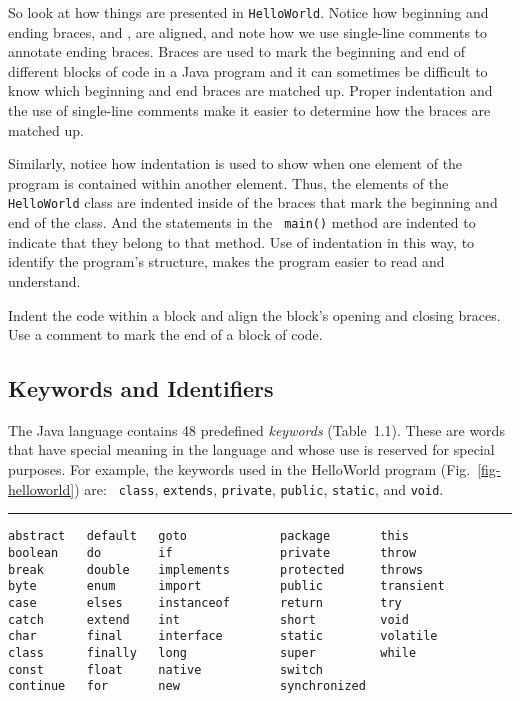 So look at how things are presented in {\tt HelloWorld}. Notice how
beginning and ending braces, { and }, are aligned, and
note how we use single-line comments to annotate ending braces. Braces
are used to mark the beginning and end of different blocks of code in
a Java program and it can sometimes be difficult to know which
beginning and end braces are matched up. Proper indentation and the
use of single-line comments make it easier to determine how the braces
are matched up.

Similarly, notice how indentation is used to show when one element of
the program is contained within another element. Thus, the elements of
the {\tt HelloWorld} class are indented inside of the braces that mark
the beginning and end of the class. And the statements in the {\tt
main()} method are indented to indicate that they belong to that
method.  Use of indentation in this way, to identify the program's
structure, makes the program easier to read and understand.

{Indent the code within a block and align the block's opening and closing
braces.  Use a comment to mark the end of a block of code.}

\subsection{Keywords and Identifiers}
\label{sec-keywords}
\label{pg-sec-keywords}

\noindent The Java language contains 48 predefined {\it keywords} (Table~1.1).
These are words that have special meaning in the language and whose
use is reserved for special purposes. For example, the keywords used
in the HelloWorld program (Fig.~\ref{fig-helloworld}) are: {\tt
class}, {\tt extends}, {\tt private}, {\tt public}, {\tt static}, and
{\tt void}. 

\begin{table}[htb]
{\color{cyan}\rule{27pc}{1pt}}\par\vspace{-10pt}
\begin{verbatim}
abstract   default   goto             package       this
boolean    do        if               private       throw
break      double    implements       protected     throws
byte       enum      import           public        transient
case       elses     instanceof       return        try
catch      extend    int              short         void
char       final     interface        static        volatile
class      finally   long             super         while
const      float     native           switch
continue   for       new              synchronized
\end{verbatim}
\par\vspace{-14pt}{\color{cyan}\rule{27pc}{1pt}}
\endTB
\end{table}

